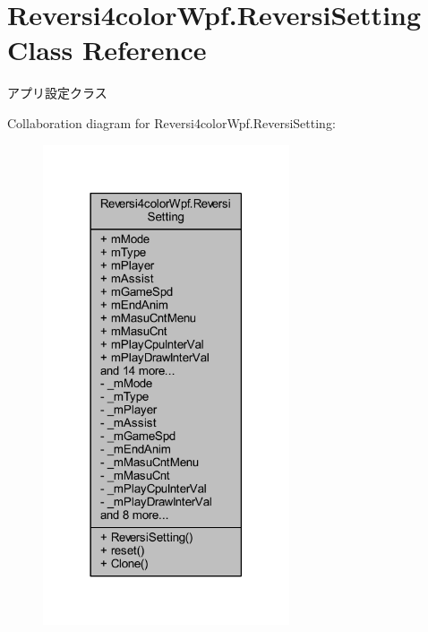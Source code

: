 \hypertarget{class_reversi4color_wpf_1_1_reversi_setting}{}\section{Reversi4color\+Wpf.\+Reversi\+Setting Class Reference}
\label{class_reversi4color_wpf_1_1_reversi_setting}


アプリ設定クラス  




Collaboration diagram for Reversi4color\+Wpf.\+Reversi\+Setting\+:
\nopagebreak
\begin{figure}[H]
\begin{center}
\leavevmode
\includegraphics[width=206pt]{class_reversi4color_wpf_1_1_reversi_setting__coll__graph}
\end{center}
\end{figure}
